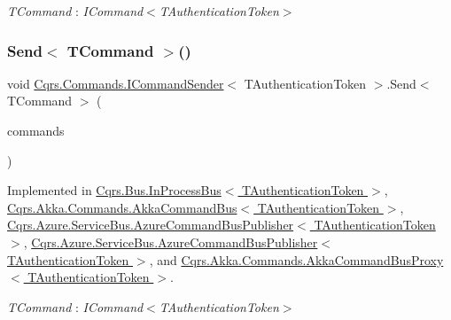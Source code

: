 \begin{Desc}
\item[Type Constraints]\begin{description}
\item[{\em T\+Command} : {\em I\+Command$<$T\+Authentication\+Token$>$}]\end{description}
\end{Desc}
\mbox{\label{interfaceCqrs_1_1Commands_1_1ICommandSender_a3fb3ec40a3e862f721a7c9204e67e832_a3fb3ec40a3e862f721a7c9204e67e832}} 
\subsubsection{\texorpdfstring{Send$<$ T\+Command $>$()}{Send< TCommand >()}\hspace{0.1cm}{\footnotesize\ttfamily [2/2]}}
{\footnotesize\ttfamily void \hyperlink{interfaceCqrs_1_1Commands_1_1ICommandSender}{Cqrs.\+Commands.\+I\+Command\+Sender}$<$ T\+Authentication\+Token $>$.Send$<$ T\+Command $>$ (\begin{DoxyParamCaption}\item[{I\+Enumerable$<$ T\+Command $>$}]{commands }\end{DoxyParamCaption})}



Implemented in \hyperlink{classCqrs_1_1Bus_1_1InProcessBus_ae5dae5f2445387280c974ec181167055_ae5dae5f2445387280c974ec181167055}{Cqrs.\+Bus.\+In\+Process\+Bus$<$ T\+Authentication\+Token $>$}, \hyperlink{classCqrs_1_1Akka_1_1Commands_1_1AkkaCommandBus_a06b7b148493c67d79aaf6b7d59afa487_a06b7b148493c67d79aaf6b7d59afa487}{Cqrs.\+Akka.\+Commands.\+Akka\+Command\+Bus$<$ T\+Authentication\+Token $>$}, \hyperlink{classCqrs_1_1Azure_1_1ServiceBus_1_1AzureCommandBusPublisher_a1f6742c31a81a1bc96962acd28d4e8d2_a1f6742c31a81a1bc96962acd28d4e8d2}{Cqrs.\+Azure.\+Service\+Bus.\+Azure\+Command\+Bus\+Publisher$<$ T\+Authentication\+Token $>$}, \hyperlink{classCqrs_1_1Azure_1_1ServiceBus_1_1AzureCommandBusPublisher_a1f6742c31a81a1bc96962acd28d4e8d2_a1f6742c31a81a1bc96962acd28d4e8d2}{Cqrs.\+Azure.\+Service\+Bus.\+Azure\+Command\+Bus\+Publisher$<$ T\+Authentication\+Token $>$}, and \hyperlink{classCqrs_1_1Akka_1_1Commands_1_1AkkaCommandBusProxy_a30115e2f8c964967aa8fe94712ece7c2_a30115e2f8c964967aa8fe94712ece7c2}{Cqrs.\+Akka.\+Commands.\+Akka\+Command\+Bus\+Proxy$<$ T\+Authentication\+Token $>$}.

\begin{Desc}
\item[Type Constraints]\begin{description}
\item[{\em T\+Command} : {\em I\+Command$<$T\+Authentication\+Token$>$}]\end{description}
\end{Desc}
